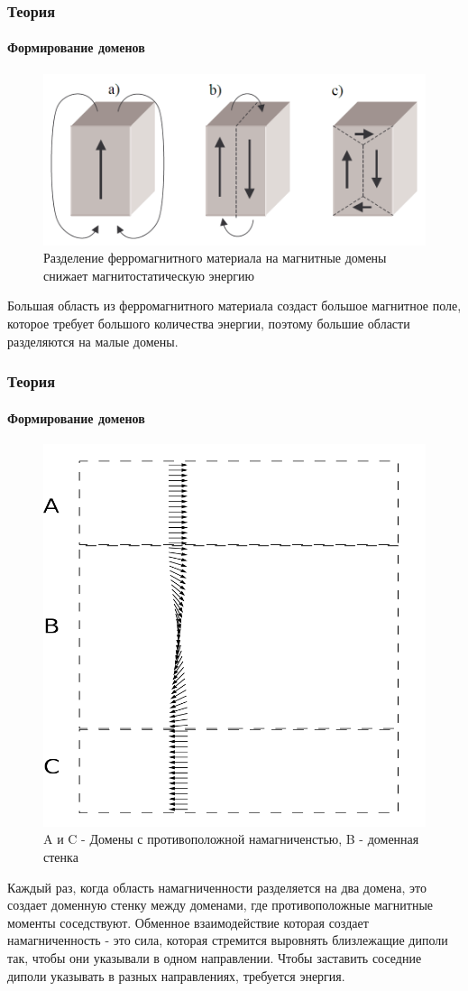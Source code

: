 \documentclass[8pt,pdf,hyperref={unicode}]{beamer}
\begin{document}
	\begin{frame}
		\frametitle{Теория}
		\framesubtitle{Формирование доменов}
		\begin{center}
			\begin{figure}[h!]
				\centering
				\includegraphics[width=.7\linewidth]{Домены2.png}
				\caption{Разделение ферромагнитного материала на магнитные домены снижает магнитостатическую энергию}
				\label{fig:3}
			\end{figure}
		Большая область из ферромагнитного материала создаст большое магнитное поле, которое требует большого количества энергии, поэтому большие области разделяются на малые домены.
		\end{center}
	\end{frame}

	\begin{frame}
		\frametitle{Теория}
		\framesubtitle{Формирование доменов}
		\begin{center}
			\begin{figure}[h!]
				\centering
				\includegraphics[width=.35\linewidth]{Домены4.png}
				\caption{A и C - Домены с противоположной намагниченстью, B - доменная стенка}
				\label{fig:3}
			\end{figure}
			Каждый раз, когда область намагниченности разделяется на два домена, это создает доменную стенку между доменами, где противоположные магнитные моменты соседствуют. Обменное взаимодействие которая создает намагниченность - это сила, которая стремится выровнять близлежащие диполи так, чтобы они указывали в одном направлении. Чтобы заставить соседние диполи указывать в разных направлениях, требуется энергия.
		\end{center}
	\end{frame}
	
\end{document}
